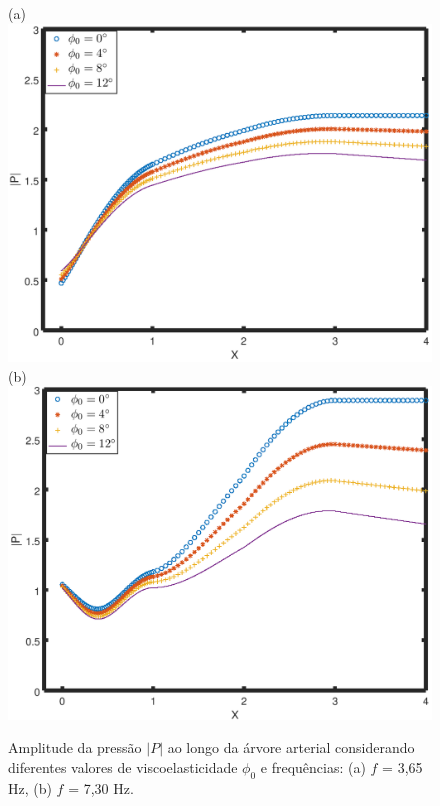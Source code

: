 \documentclass[
        english,			
        brazil			        %
        ,<...>]{abntbibufjf}
\begin{document}
\begin{figure}[!htbp]
	\centering
	(a) \\
	\includegraphics[scale=0.7]{figure4-result/Figure4_f_3_65_new.png}\\
	(b)\\
	\includegraphics[scale=0.7]{figure4-result/Figure4_f_7_30_new.png}\\
	\caption{Amplitude da pressão $|P|$ ao longo da árvore arterial considerando diferentes valores de viscoelasticidade $\phi_0$ e frequências: (a) $f$ = 3,65 Hz, (b)  $f$ = 7,30 Hz. }
	\label{fig4a:arterial-tree}%
\end{figure}
\end{document}

